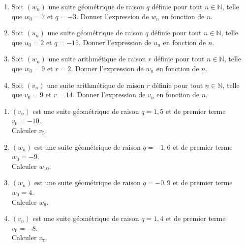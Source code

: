 \documentclass[11pt]{article}
\begin{document}
\begin{multicols}{2}
  \begin{exercice}
    \begin{enumerate}
    \item Soit $(w_n)$ une suite géométrique de raison $q$ définie
      pour tout $n\in \mathbb{N}$, telle que $w_0=7$ et $q=-3$.
      Donner l'expression de $w_n$ en fonction de $n$.
    \item Soit $(u_n)$ une suite géométrique de raison $q$ définie
      pour tout $n\in \mathbb{N}$, telle que $u_0=2$ et $q=-15$.
      Donner l'expression de $u_n$ en fonction de $n$.
    \item Soit $(w_n)$ une suite arithmétique de raison $r$ définie
      pour tout $n\in\mathbb{N}$, telle que $w_0=9$ et $r=2$.  Donner
      l'expression de $w_n$ en fonction de $n$.
    \item Soit $(v_n)$ une suite arithmétique de raison $r$ définie
      pour tout $n\in\mathbb{N}$, telle que $v_0=9$ et $r=14$.  Donner
      l'expression de $v_n$ en fonction de $n$.
    \end{enumerate}
  \end{exercice}

  \begin{exercice}
    \begin{enumerate}
    \item $(v_n)$ est une suite géométrique de raison $q=1{,}5$ et de premier terme $v_0=-10$.\\
      Calculer $v_{5}$.
    \item $(w_n)$ est une suite géométrique de raison $q=-1{,}6$ et de premier terme $w_0=-9$.\\
      Calculer $w_{10}$.
    \item $(w_n)$ est une suite géométrique de raison $q=-0{,}9$ et de premier terme $w_0=4$.\\
      Calculer $w_{6}$.
    \item $(v_n)$ est une suite géométrique de raison $q=1{,}4$ et de premier terme $v_0=-8$.\\
      Calculer $v_{7}$.
    \end{enumerate}
  \end{exercice}
\end{multicols}
\end{document}
